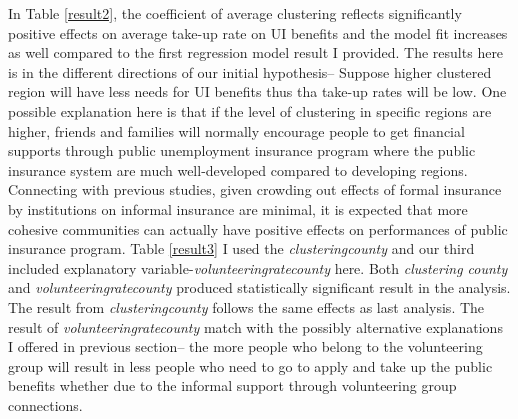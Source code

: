 \documentclass{article}
\begin{document}
In Table \ref{result2}, the coefficient of average clustering reflects significantly positive effects on average take-up rate on UI benefits and the model fit increases as well compared to the first regression model result I provided. The results here is in the different directions of our initial hypothesis-- Suppose higher clustered region will have less needs for UI benefits thus tha take-up rates will be low. One possible explanation here is that if the level of clustering in specific regions are higher, friends and families will normally encourage people to get financial supports through public unemployment insurance program where the public insurance system are much well-developed compared to developing regions. Connecting with previous studies, given crowding out effects of formal insurance by institutions on informal insurance are minimal, it is expected that more cohesive communities can actually have positive effects on performances of public insurance program. Table \ref{result3} I used the \textit{clustering\textunderscore county} and our third included explanatory variable-\textit{volunteering\textunderscore rate\textunderscore county} here. Both \textit{clustering \textunderscore county} and \textit{volunteering\textunderscore rate\textunderscore county} produced statistically significant result in the analysis. The result from \textit{clustering\textunderscore county} follows the same effects as last analysis. The result of \textit{volunteering\textunderscore rate\textunderscore county} match with the possibly alternative explanations I offered in previous section-- the more people who belong to the volunteering group will result in less people who need to go to apply and take up the public benefits whether due to the informal support through volunteering group connections.
\end{document}

